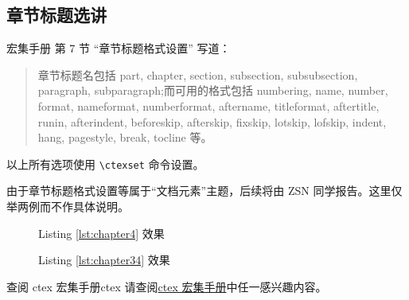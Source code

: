 \subsection{章节标题选讲}\label{sec:section-title}
\CTeX 宏集手册 \cite{ctex} 第 7 节 “章节标题格式设置” 写道：
\begin{quote}
章节标题名包括 part, chapter, section, subsection, subsubsection,
paragraph, subparagraph;而可用的格式包括 numbering, name, number, format, nameformat, numberformat, aftername, titleformat, aftertitle, runin, afterindent, beforeskip, afterskip, fixskip, lotskip, lofskip, indent, hang, pagestyle, break, tocline 等。
\end{quote}
以上所有选项使用 \verb|\ctexset| 命令设置。

由于章节标题格式设置等属于“文档元素”主题，后续将由 ZSN 同学报告。这里仅举两例而不作具体说明。

\begin{figure}
\centering
\caption{Listing \ref{lst:chapter4} 效果}
\label{img:4}
\end{figure}
\begin{figure}
\centering
{}
\caption{Listing \ref{lst:chapter34} 效果}
\label{img:34}
\end{figure}


\begin{Ex}{查阅 ctex 宏集手册}{ctex}
请查阅\href{http://mirrors.ctan.org/language/chinese/ctex/ctex.pdf}{ctex 宏集手册}中任一感兴趣内容。
\end{Ex}
